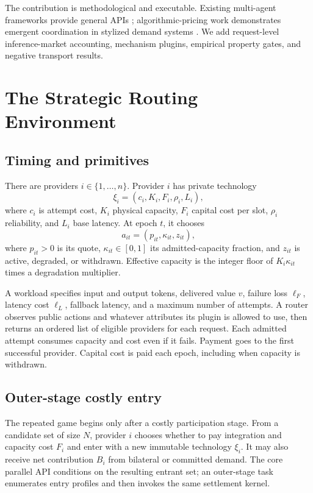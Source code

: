 \documentclass[10pt]{article}
\newcommand{\1}{\mathbf 1}
\begin{document}
The contribution is methodological and executable.  Existing multi-agent
frameworks provide general APIs \citep{terry2021pettingzoo,lanctot2019openspiel};
algorithmic-pricing work demonstrates emergent coordination in stylized demand
systems \citep{calvano2020}.  We add request-level inference-market accounting,
mechanism plugins, empirical property gates, and negative transport results.

\section{The Strategic Routing Environment}
\label{sec:environment}

\subsection{Timing and primitives}

There are providers $i\in\{1,\ldots,n\}$.  Provider $i$ has private technology
\[
\xi_i=(c_i,K_i,F_i,\rho_i,L_i),
\]
where $c_i$ is attempt cost, $K_i$ physical capacity, $F_i$ capital cost per
slot, $\rho_i$ reliability, and $L_i$ base latency.  At epoch $t$, it chooses
\[
a_{it}=(p_{it},\kappa_{it},z_{it}),
\]
where $p_{it}>0$ is its quote, $\kappa_{it}\in[0,1]$ its admitted-capacity
fraction, and $z_{it}$ is active, degraded, or withdrawn.  Effective capacity is
the integer floor of $K_i\kappa_{it}$ times a degradation multiplier.

A workload specifies input and output tokens, delivered value $v$, failure loss
$\ell_F$, latency cost $\ell_L$, fallback latency, and a maximum number of
attempts.  A router observes public actions and whatever attributes its plugin is
allowed to use, then returns an ordered list of eligible providers for each
request.  Each admitted attempt consumes capacity and cost even if it fails.
Payment goes to the first successful provider.  Capital cost is paid each epoch,
including when capacity is withdrawn.

\subsection{Outer-stage costly entry}

The repeated game begins only after a costly participation stage.  From a
candidate set of size $N$, provider $i$ chooses whether to pay integration and
capacity cost $F_i$ and enter with a new immutable technology $\xi_i$.
It may also receive net contribution $B_i$ from bilateral or committed demand.
The core parallel API conditions on the resulting entrant set; an outer-stage
task enumerates entry profiles and then invokes the same settlement kernel.
\end{document}
